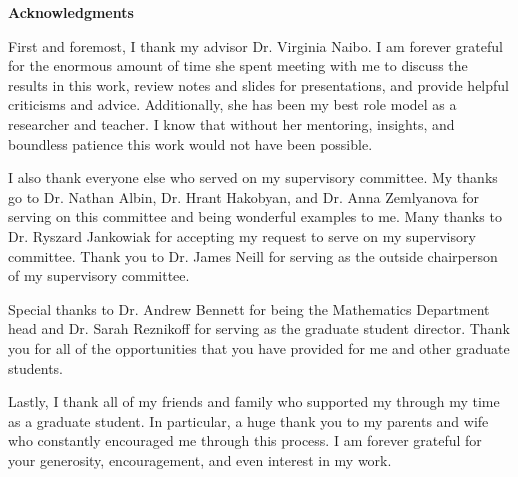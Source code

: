 
\newpage
\vspace*{0.9cm}
\begin{center}
{\bf \Huge Acknowledgments}
\end{center}

\setlength{\baselineskip}{0.8cm}



First and foremost, I thank my advisor Dr. Virginia Naibo. I am forever grateful for the enormous amount of time she spent meeting with me to discuss the results in this work, review notes and slides for presentations, and provide helpful criticisms and advice. Additionally, she has been my best role model as a researcher and teacher. I know that without her mentoring, insights, and boundless patience this work would not have been possible.

I also thank everyone else who served on my supervisory committee. My thanks go to Dr. Nathan Albin, Dr. Hrant Hakobyan, and Dr. Anna Zemlyanova for serving on this committee and being wonderful examples to me. Many thanks to Dr. Ryszard Jankowiak for accepting my request to serve on my supervisory committee. Thank you to Dr. James Neill for serving as the outside chairperson of my supervisory committee. 

Special thanks to Dr. Andrew Bennett for being the Mathematics Department head and Dr. Sarah Reznikoff for serving as the graduate student director. Thank you for all of the opportunities that you have provided for me and other graduate students.

Lastly, I thank all of my friends and family who supported my through my time as a graduate student. In particular, a huge thank you to my parents and wife who constantly encouraged me through this process. I am forever grateful for your generosity, encouragement, and even interest in my work.